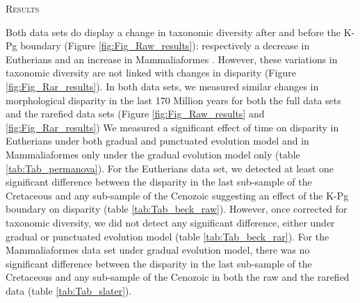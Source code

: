 \documentclass[12pt,letterpaper]{article}
\renewcommand{\section}[1]{%
\bigskip
\begin{center}
\begin{Large}
\normalfont\scshape #1
\medskip
\end{Large}
\end{center}}
\begin{document}


%
%

\section{Results}
Both data sets do display a change in taxonomic diversity after and before the K-Pg boundary (Figure \ref{fig:Fig_Raw_results}): respectively a decrease in Eutherians \citep[data from][]{beckancient2014} and an increase in Mammaliaformes \citep[data from][]{Slater2012MEE}.
However, these variations in taxonomic diversity are not linked with changes in disparity (Figure \ref{fig:Fig_Rar_results}).
In both data sets, we measured similar changes in morphological disparity in the last 170 Million years for both the full data sets and the rarefied data sets (Figure \ref{fig:Fig_Raw_results} and \ref{fig:Fig_Rar_results})
We measured a significant effect of time on disparity in Eutherians under both gradual and punctuated evolution model and in Mammaliaformes only under the gradual evolution model only (table \ref{tab:Tab_permanova}).
For the Eutherians data set, we detected at least one significant difference between the disparity in the last sub-sample of the Cretaceous and any sub-sample of the Cenozoic suggesting an effect of the K-Pg boundary on disparity (table \ref{tab:Tab_beck_raw}).
However, once corrected for taxonomic diversity, we did not detect any significant difference, either under gradual or punctuated evolution model (table \ref{tab:Tab_beck_rar}).
For the Mammaliaformes data set under gradual evolution model, there was no significant difference between the disparity in the last sub-sample of the Cretaceous and any sub-sample of the Cenozoic in both the raw and the rarefied data (table \ref{tab:Tab_slater}).
\end{document}
